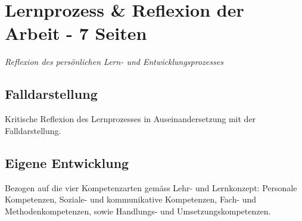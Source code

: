 \section{Lernprozess \& Reflexion der Arbeit - 7 Seiten}\label{Reflexion}
\textit{Reflexion des persönlichen Lern- und Entwicklungsprozesses}
\subsection{Falldarstellung} Kritische Reflexion des Lernprozesses in Auseinandersetzung mit der Falldarstellung.
\subsection{Eigene Entwicklung} Bezogen auf die vier Kompetenzarten gemäss Lehr- und Lernkonzept: Personale Kompetenzen, Soziale- und kommunikative Kompetenzen, Fach- und Methodenkompetenzen, sowie Handlungs- und Umsetzungskompetenzen.

